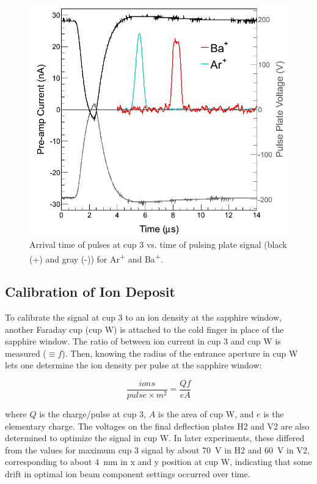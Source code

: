 \begin{figure}[h]
        \centering
                \includegraphics[width=.7\textwidth]{figures/pulses_BaAr.png}
                \caption{Arrival time of pulses at cup 3 vs. time of pulsing plate signal (black (+) and gray (-)) for Ar\textsuperscript{+} and Ba\textsuperscript{+}.}
\label{fig:pulses_ArBa}
\end{figure}

\subsection{Calibration of Ion Deposit}
\label{subsec:ionDepCal}

To calibrate the signal at cup 3 to an ion density at the sapphire window, another Faraday cup (cup W) is attached to the cold finger in place of the sapphire window.  The ratio of between ion current in cup 3 and cup W is measured ($\equiv f$).  Then, knowing the radius of the entrance aperture in cup W lets one determine the ion density per pulse at the sapphire window:

\begin{equation}
\frac{ions}{pulse \times m^{2}} = \frac{Q f}{e A}
\label{eqn:ion_density}
\end{equation}

\noindent
where $Q$ is the charge/pulse at cup 3, $A$ is the area of cup W, and $e$ is the elementary charge.  The voltages on the final deflection plates H2 and V2 are also determined to optimize the signal in cup W.  In later experiments, these differed from the values for maximum cup 3 signal by about 70~V in H2 and 60~V in V2, corresponding to about 4~mm in x and y position at cup W, indicating that some drift in optimal ion beam component settings occurred over time.

